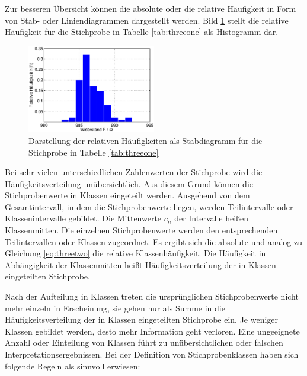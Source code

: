 \noindent Zur besseren \"{U}bersicht k\"{o}nnen die absolute oder die relative H\"{a}ufigkeit in Form von Stab- oder Liniendiagrammen dargestellt werden. Bild \ref{fig:HaeufigkeitStichprobeWiderstand} stellt die relative H\"{a}ufigkeit f\"{u}r die Stichprobe in Tabelle \ref{tab:threeone} als Histogramm dar.

\noindent 
\begin{figure}[H]
  \centerline{\includegraphics[width=0.5\textwidth]{Kapitel3/Bilder/image2}}
  \caption{Darstellung der relativen H\"{a}ufigkeiten als Stabdiagramm f\"{u}r die Stichprobe in Tabelle \ref{tab:threeone}}
  \label{fig:HaeufigkeitStichprobeWiderstand}
\end{figure}

\noindent Bei sehr vielen unterschiedlichen Zahlenwerten der Stichprobe wird die H\"{a}ufigkeitsverteilung un\"{u}bersichtlich. Aus diesem Grund k\"{o}nnen die Stichprobenwerte in Klassen eingeteilt werden. Ausgehend von dem Gesamtintervall, in dem die Stichprobenwerte liegen, werden Teilintervalle oder Klassenintervalle gebildet. Die Mittenwerte $c_{n}$ der Intervalle hei{\ss}en Klassenmitten. Die einzelnen Stichprobenwerte werden den entsprechenden Teilintervallen oder Klassen zugeordnet. Es ergibt sich die absolute und analog zu Gleichung \eqref{eq:threetwo} die relative Klassenh\"{a}ufigkeit. Die H\"{a}ufigkeit in Abh\"{a}ngigkeit der Klassenmitten hei{\ss}t H\"{a}ufigkeitsverteilung der in Klassen eingeteilten Stichprobe.\newline

\noindent Nach der Aufteilung in Klassen treten die urspr\"{u}nglichen Stichprobenwerte nicht mehr einzeln in Erscheinung, sie gehen nur als Summe in die H\"{a}ufigkeitsverteilung der in Klassen eingeteilten Stichprobe ein. Je weniger Klassen gebildet werden, desto mehr Information geht verloren. Eine ungeeignete Anzahl oder Einteilung von Klassen f\"{u}hrt zu un\"{u}bersichtlichen oder falschen Interpretationsergebnissen. Bei der Definition von Stichprobenklassen haben sich folgende Regeln als sinnvoll erwiesen:

